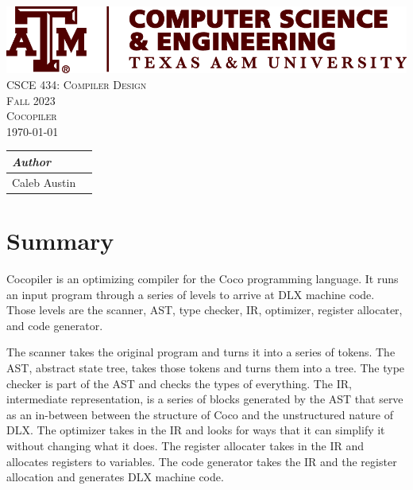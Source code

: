 \documentclass{tamureport}
\def\course{CSCE 434: Compiler Design}      %
\def\thetitle{Cocopiler}               %
\def\date{\today}                         %
\begin{document}
\begin{center}
    
    \vspace*{1.5cm}
    \includegraphics[scale = 0.4]{CSCE_logo.png}\\[1.75cm]
    \textsc{\huge{\course}}\\[.5cm]
    \textsc{\Large{Fall 2023}}\\[.5cm]
    \textsc{\Large{\thetitle}}\\[.5cm]
    \textsc{\date}\\[2cm]
    \vspace{2em} 
    \begin{tabular}{L{4cm} R{4cm}}
        \textit{Author}\\
        \hline
        Caleb Austin
    \end{tabular}
\end{center}
\thispagestyle{empty}
\pagebreak


\sloppy


\section*{Summary}
Cocopiler is an optimizing compiler for the Coco programming language. It runs an input program through a series of levels to arrive at DLX machine code. Those levels are the scanner, AST, type checker, IR, optimizer, register allocater, and code generator. 

The scanner takes the original program and turns it into a series of tokens. 
The AST, abstract state tree, takes those tokens and turns them into a tree. 
The type checker is part of the AST and checks the types of everything. 
The IR, intermediate representation, is a series of blocks generated by the AST that serve as an in-between between the structure of Coco and the unstructured nature of DLX. 
The optimizer takes in the IR and looks for ways that it can simplify it without changing what it does. 
The register allocater takes in the IR and allocates registers to variables. 
The code generator takes the IR and the register allocation and generates DLX machine code. 
\end{document}
